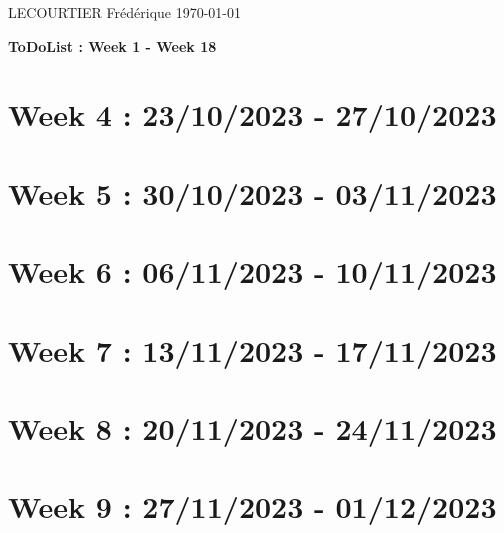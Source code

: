 \documentclass{article}
\begin{document}
	LECOURTIER Frédérique \hfill \today
	\begin{center}
		\Large\textbf{{ToDoList : Week 1 - Week 18}}
	\end{center}
	\tableofcontents

	\newpage

	\section*{Week 4 : 23/10/2023 - 27/10/2023}
	

	\newpage

	\section*{Week 5 : 30/10/2023 - 03/11/2023}
	

	\newpage

	\section*{Week 6 : 06/11/2023 - 10/11/2023}
	

	\newpage

	\section*{Week 7 : 13/11/2023 - 17/11/2023}
	

	\newpage

	\section*{Week 8 : 20/11/2023 - 24/11/2023}
	

	\newpage

	\section*{Week 9 : 27/11/2023 - 01/12/2023}
	

	\newpage
\end{document}
